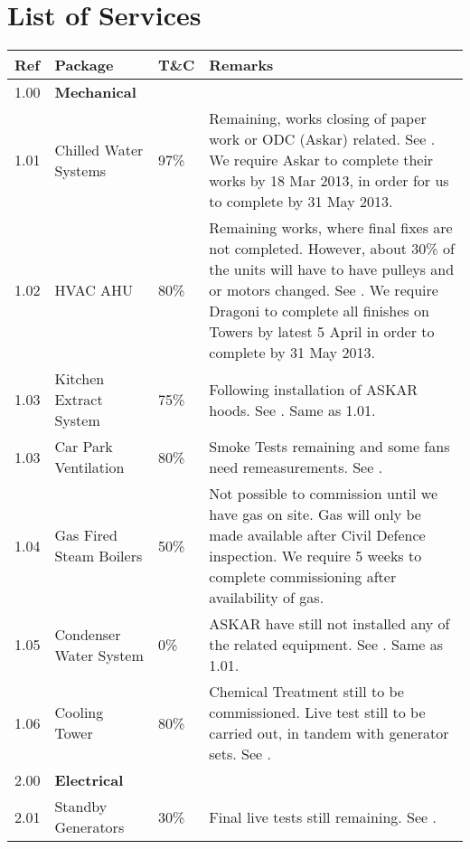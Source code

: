 \section*{List of Services}


\label{masterplan}
{\RaggedRight\small
\begin{longtable}{lllp{5.3cm}@{}}
\toprule
Ref	&Package	&T\&C	&Remarks\\
\midrule
1.00	&\textbf{Mechanical}	&	&\\
1.01	&Chilled Water Systems	&97\%	&Remaining, works closing of paper work or ODC (Askar) related. See {chilledwater}. We require Askar to complete their works by 18 Mar 2013, in order for us to complete by 31 May 2013.\\

1.02	&HVAC AHU  & 80\%		&  Remaining works, where final fixes are not completed. However, about 30\% of the units will have to have pulleys and or motors changed. See {HVAC}. We require Dragoni to complete all finishes on Towers by latest 5 April in order to complete by 31 May 2013.\\

1.03    &Kitchen Extract System &75\%& Following installation of ASKAR hoods. See {kitchenextract}. Same as 1.01.\\

1.03	&Car Park Ventilation 	&80\%&Smoke Tests remaining and some fans need remeasurements. See {carparkventilation}. \\

1.04	&Gas Fired Steam Boilers &50\%&Not possible to commission until we have gas on site. Gas will only be made available after Civil Defence inspection. We require 5 weeks to complete commissioning  after availability of gas.\\

1.05	&Condenser Water System 	&0\%&ASKAR have still not installed any of the related equipment. See {chilledwaterconstraints}. Same as 1.01.   \\

1.06    &Cooling Tower &80\%&Chemical Treatment still to be commissioned. Live test still to be carried out, in tandem with generator sets. See {generators}.  \\
\midrule

2.00	&\textbf{Electrical}		&&\\
2.01	&Standby Generators	&30\%& Final live tests still remaining. See \sref{generators}. \\
	

\end{longtable}}

